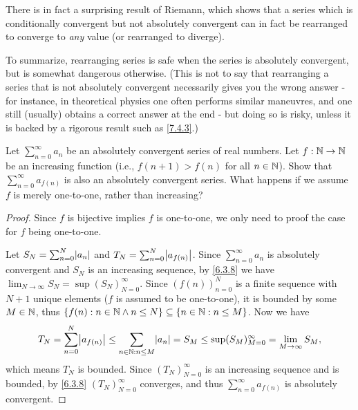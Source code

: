 \begin{note}
  There is in fact a surprising result of Riemann, which shows that a series which is conditionally convergent but not absolutely convergent can in fact be rearranged to converge to \emph{any} value
  (or rearranged to diverge).
\end{note}

\begin{note}
  To summarize, rearranging series is safe when the series is absolutely convergent, but is somewhat dangerous otherwise.
  (This is not to say that rearranging a series that is not absolutely convergent necessarily gives you the wrong answer
  - for instance, in theoretical physics one often performs similar maneuvres, and one still (usually) obtains a correct answer at the end
  - but doing so is risky, unless it is backed by a rigorous result such as \cref{7.4.3}.)
\end{note}

\exercisesection

\begin{ex}\label{ex:7.4.1}
  Let \(\sum_{n = 0}^\infty a_n\) be an absolutely convergent series of real numbers.
  Let \(f : \mathbb{N} \to \mathbb{N}\) be an increasing function (i.e., \(f(n + 1) > f(n)\) for all \(n \in \mathbb{N}\)).
  Show that \(\sum_{n = 0}^\infty a_{f(n)}\) is also an absolutely convergent series.
  What happens if we assume \(f\) is merely one-to-one, rather than increasing?
\end{ex}

\begin{proof}
  Since \(f\) is bijective implies \(f\) is one-to-one, we only need to proof the case for \(f\) being one-to-one.

  Let \(S_N = \sum_{n = 0}^N \abs{a_n}\) and \(T_N = \sum_{n = 0}^N \abs{a_{f(n)}}\).
  Since \(\sum_{n = 0}^\infty a_n\) is absolutely convergent and \(S_N\) is an increasing sequence, by \cref{6.3.8} we have \(\lim_{N \to \infty} S_N = \sup(S_N)_{N = 0}^\infty\).
  Since \((f(n))_{n = 0}^N\) is a finite sequence with \(N + 1\) unique elements (\(f\) is assumed to be one-to-one), it is bounded by some \(M \in \mathbb{N}\), thus \(\left\lbrace f(n) : n \in \mathbb{N} \land n \leq N\right\rbrace \subseteq \left\lbrace n \in \mathbb{N} : n \leq M\right\rbrace\).
  Now we have
  \[
    T_N = \sum_{n = 0}^N \abs{a_{f(n)}} \leq \sum_{n \in \N : n \leq M} \abs{a_n} = S_M \leq \sup(S_M)_{M = 0}^\infty = \lim_{M \to \infty} S_M,
  \]
  which means \(T_N\) is bounded.
  Since \((T_N)_{N = 0}^\infty\) is an increasing sequence and is bounded, by \cref{6.3.8} \((T_N)_{N = 0}^\infty\) converges, and thus \(\sum_{n = 0}^\infty a_{f(n)}\) is absolutely convergent.
\end{proof}

